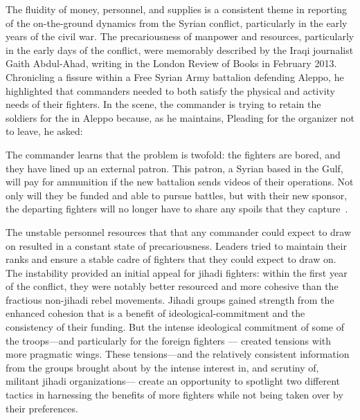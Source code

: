 The fluidity of money, personnel, and supplies is a consistent theme in reporting of the on-the-ground dynamics from the Syrian conflict, particularly in the early years of the civil war.  The precariousness of manpower and resources, particularly in the early days of the conflict, were memorably described by the Iraqi journalist Gaith Abdul-Ahad, writing in the London Review of Books in February 2013. Chronicling a fissure within a  Free Syrian Army battalion defending Aleppo, he highlighted that commanders needed to both satisfy the physical and activity needs of their fighters. In the scene, the commander is trying to retain the soldiers for the  in Aleppo because, as he maintains,  Pleading for the organizer not to leave, he asked: \autocite{abdul2013start}

The commander learns that the problem is twofold: the fighters are bored, and they have lined up an external patron. This patron, a Syrian based in the Gulf, will pay for ammunition if the new battalion sends videos of their operations. Not only will they be funded and able to pursue battles, but with their new sponsor, the departing fighters will no longer have to share any spoils that they capture~\autocite{abdul2013start}.

The unstable personnel resources that that any commander could expect to draw on resulted in a constant state of precariousness. Leaders tried to maintain their ranks and ensure a stable cadre of fighters that they could expect to draw on. The instability provided an initial appeal for jihadi fighters: within the first year of the conflict, they were notably better resourced and more cohesive than the fractious non-jihadi rebel movements.  Jihadi groups gained strength from the enhanced cohesion that is a benefit of ideological-commitment and the consistency of their funding. But the intense ideological commitment of some of the troops---and particularly for the foreign fighters --- created tensions with more pragmatic wings. These tensions---and the relatively consistent information from the groups brought about by the intense interest in, and scrutiny of, militant jihadi organizations--- create an opportunity to spotlight two different tactics in harnessing the benefits of more fighters while not being taken over by their preferences.  

